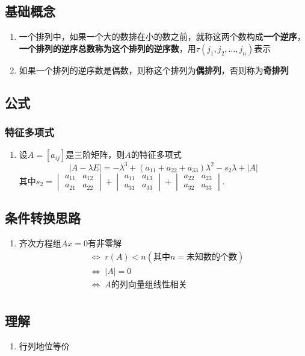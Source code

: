 \documentclass[./linear_algebra.tex]{subfiles}
\begin{document}
    \subsection{基础概念}
    \begin{enumerate}
        \item 一个排列中，如果一个大的数排在小的数之前，就称这两个数构成\textbf{一个逆序}，\textbf{一个排列的逆序总数称为这个排列的逆序数}，用$\tau(j_1, j_2, \dots, j_n)$表示
        \item 如果一个排列的逆序数是偶数，则称这个排列为\textbf{偶排列}，否则称为\textbf{奇排列}
    \end{enumerate}

    \subsection{公式}

    \subsubsection{特征多项式}

    \begin{enumerate}
        \item 设$A = [a_{ij}]$是三阶矩阵，则$A$的特征多项式
        \[
            |A - \lambda E| = -\lambda^3 + (a_{11} + a_{22} + a_{33})\lambda^2 - s_2 \lambda + |A|
        \]其中$s_2 =
        \begin{vmatrix}
            a_{11} & a_{12} \\
            a_{21} & a_{22}
        \end{vmatrix}
        +
        \begin{vmatrix}
            a_{11} & a_{13} \\
            a_{31} & a_{33}
        \end{vmatrix}
        +
        \begin{vmatrix}
            a_{22} & a_{23} \\
            a_{32} & a_{33}
        \end{vmatrix}.$
    \end{enumerate}

    \subsection{条件转换思路}

    \begin{enumerate}
        \item 齐次方程组$Ax = 0$有非零解
        \begin{align*}
            &\Leftrightarrow\; r(A) < n (\text{其中}n = \text{未知数的个数})  \\
            &\Leftrightarrow\; |A| = 0  \\
            &\Leftrightarrow\; A \text{的列向量组线性相关}  \\
        \end{align*}
    \end{enumerate}

    \subsection{理解}

    \begin{enumerate}
        \item 行列地位等价
    \end{enumerate}
\end{document}

